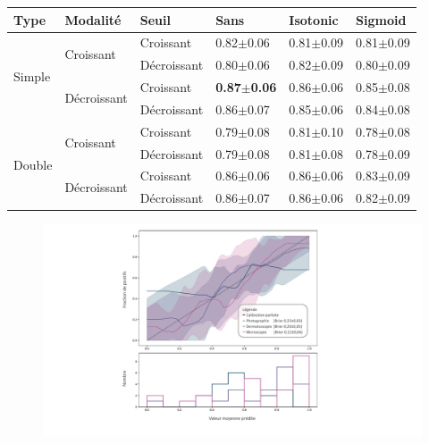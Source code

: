 \begin{table}[H]
    \begin{tabular}{llllll}
        \toprule 
        Type                    & Modalité                          & Seuil             & Sans                  & Isotonic              & Sigmoid               \\ \midrule
        \multirow{4}{*}{Simple} & \multirow{2}{*}{Croissant}        & Croissant         & 0.82$\pm$0.06         & 0.81$\pm$0.09         & 0.81$\pm$0.09         \\ \cline{3-6}
                                &                                   & Décroissant       & 0.80$\pm$0.06         & 0.82$\pm$0.09         & 0.80$\pm$0.09         \\ \cline{2-6}
                                & \multirow{2}{*}{Décroissant}      & Croissant         & \textbf{0.87$\pm$0.06}& 0.86$\pm$0.06         & 0.85$\pm$0.08         \\ \cline{3-6}
                                &                                   & Décroissant       & 0.86$\pm$0.07         & 0.85$\pm$0.06         & 0.84$\pm$0.08         \\ \cline{1-6}
        \multirow{4}{*}{Double} & \multirow{2}{*}{Croissant}        & Croissant         & 0.79$\pm$0.08         & 0.81$\pm$0.10         & 0.78$\pm$0.08         \\ \cline{3-6}
                                &                                   & Décroissant       & 0.79$\pm$0.08         & 0.81$\pm$0.08         & 0.78$\pm$0.09         \\ \cline{2-6}
                                & \multirow{2}{*}{Décroissant}      & Croissant         & 0.86$\pm$0.06         & 0.86$\pm$0.06         & 0.83$\pm$0.09         \\ \cline{3-6}
                                &                                   & Décroissant       & 0.86$\pm$0.07         & 0.86$\pm$0.06         & 0.82$\pm$0.09         \\ \bottomrule
    \end{tabular}
\end{table}

\begin{figure}[H]
    \centering
    \includegraphics[width=\linewidth]{contents/chapter_7/resources/results_calibration_sequential.pdf}
    \caption{}
    \label{fig:results_calibration_sequential}
\end{figure}\par

